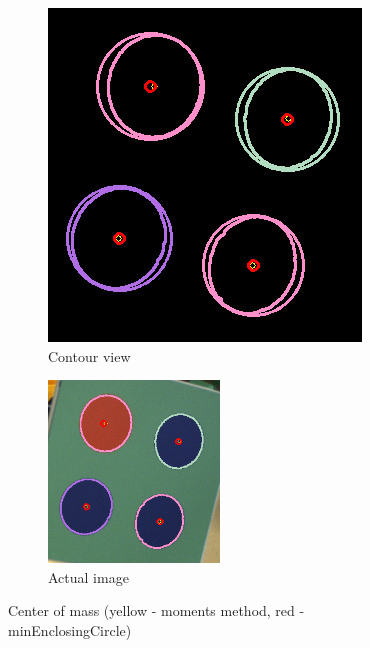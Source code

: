 \begin{figure}[ht!]
	\begin{subfigure}{.49\textwidth}
		\centering
		\includegraphics[width=\textwidth]{figures/Marker1centers}
	\caption{Contour view}
	\label{fig:markerColorcenter1}
	\end{subfigure}
	\begin{subfigure}{\textwidth}
		\centering
\includegraphics[width=0.5\textwidth]{figures/Marker1centers2}
	\caption{Actual image}
	\label{fig:markerColorcenter2}
	\end{subfigure}
\caption{Center of mass (yellow - moments method, red - minEnclosingCircle)}
\label{fig:markerColorcenter}
\end{figure}

